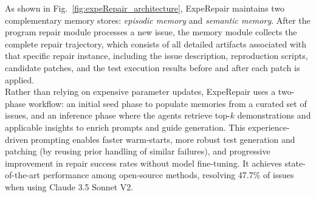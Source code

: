 As shown in Fig.~\ref{fig:expeRepair_architecture}, ExpeRepair maintains two complementary memory stores:  \emph{episodic memory} and \emph{semantic memory}. After the program repair module processes a new issue, the memory module collects the complete repair trajectory, which consists of all detailed artifacts associated with that specific repair instance, including the issue description, reproduction scripts, candidate patches, and the test execution results before and after each patch is applied.\\

\noindent
Rather than relying on expensive parameter updates, ExpeRepair uses a two-phase workflow: an initial seed phase to populate memories from a curated set of issues, and an inference phase where the agents retrieve top-$k$ demonstrations and applicable insights to enrich prompts and guide generation. This experience-driven prompting enables faster warm-starts, more robust test generation and patching (by reusing prior handling of similar failures), and progressive improvement in repair success rates without model fine-tuning. It achieves state-of-the-art performance among open-source methods, resolving 47.7\% of issues when using Claude 3.5 Sonnet V2.


